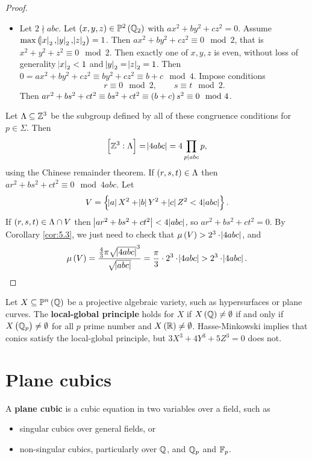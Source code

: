 \begin{proof}
\begin{itemize}
\begin{itemize}
\item Let $ 2 \nmid abc $. Let $ \br{x, y, z} \in \PP^2\br{\QQ_2} $ with $ ax^2 + by^2 + cz^2 = 0 $. Assume $ \max\br{\abs{x}_2, \abs{y}_2, \abs{z}_2} = 1 $. Then $ ax^2 + by^2 + cz^2 \equiv 0 \mod 2 $, that is $ x^2 + y^2 + z^2 \equiv 0 \mod 2 $. Then exactly one of $ x, y, z $ is even, without loss of generality $ \abs{x}_2 < 1 $ and $ \abs{y}_2 = \abs{z}_2 = 1 $. Then $ 0 = ax^2 + by^2 + cz^2 \equiv by^2 + cz^2 \equiv b + c \mod 4 $. Impose conditions
$$ r \equiv 0 \mod 2, \qquad s \equiv t \mod 2. $$
Then $ ar^2 + bs^2 + ct^2 \equiv bs^2 + ct^2 \equiv \br{b + c}s^2 \equiv 0 \mod 4 $.
\end{itemize}
\end{itemize}
Let $ \Lambda \subseteq \mathbb{Z}^3 $ be the subgroup defined by all of these congruence conditions for $ p \in \Sigma $. Then
$$ \sbr{\ZZ^3 : \Lambda} = \abs{4abc} = 4\prod_{p \mid abc} p, $$
using the Chinese remainder theorem. If $ \br{r, s, t} \in \Lambda $ then $ ar^2 + bs^2 + ct^2 \equiv 0 \mod 4abc $. Let
$$ V = \cbr{\abs{a}X^2 + \abs{b}Y^2 + \abs{c}Z^2 < 4\abs{abc}}. $$
If $ \br{r, s, t} \in \Lambda \cap V $ then $ \abs{ar^2 + bs^2 + ct^2} < 4\abs{abc} $, so $ ar^2 + bs^2 + ct^2 = 0 $. By Corollary \ref{cor:5.3}, we just need to check that $ \mu\br{V} > 2^3 \cdot \abs{4abc} $, and
$$ \mu\br{V} = \dfrac{\tfrac{4}{3}\pi\sqrt{\abs{4abc}}^3}{\sqrt{\abs{abc}}} = \dfrac{\pi}{3} \cdot 2^3 \cdot \abs{4abc} > 2^3 \cdot \abs{4abc}. $$
\end{proof}

\begin{remark}
Let $ X \subseteq \PP^n\br{\QQ} $ be a projective algebraic variety, such as hypersurfaces or plane curves. The \textbf{local-global principle} holds for $ X $ if $ X\br{\QQ} \ne \emptyset $ if and only if $ X\br{\QQ_p} \ne \emptyset $ for all $ p $ prime number and $ X\br{\RR} \ne \emptyset $. Hasse-Minkowski implies that conics satisfy the local-global principle, but $ 3X^3 + 4Y^3 + 5Z^3 = 0 $ does not.
\end{remark}

\pagebreak

\section{Plane cubics}


\begin{definition}
A \textbf{plane cubic} is a cubic equation in two variables over a field, such as
\begin{itemize}
\item singular cubics over general fields, or
\item non-singular cubics, particularly over $ \mathbb{Q} $, and $ \mathbb{Q}_p $ and $ \mathbb{F}_p $.
\end{itemize}
\end{definition}

